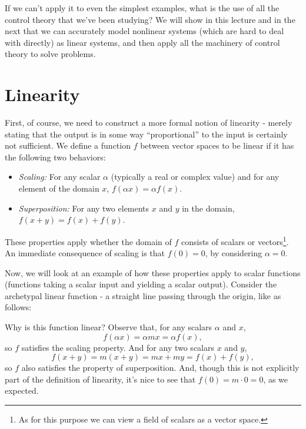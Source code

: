 \documentclass[letterpaper]{article}
\theoremstyle{remark}
\begin{document}
If we can't apply it to even the simplest examples, what is the use of all the control theory that we've been studying? We will show in this lecture and in the next that we can accurately model nonlinear systems (which are hard to deal with directly) as linear systems, and then apply all the machinery of control theory to solve problems.

\section{Linearity}
First, of course, we need to construct a more formal notion of linearity - merely stating that the output is in some way ``proportional'' to the input is certainly not sufficient. We define a function $f$ between vector spaces to be linear if it has the following two behaviors:
\begin{itemize}
    \item \emph{Scaling:} For any scalar $\alpha$ (typically a real or complex value) and for any element of the domain $x$, $f(\alpha x) = \alpha f(x)$.
    \item \emph{Superposition:} For any two elements $x$ and $y$ in the domain, $f(x + y) = f(x) + f(y)$.
\end{itemize}
These properties apply whether the domain of $f$ consists of scalars or vectors\footnote{As for this purpose we can view a field of scalars as a vector space.}. An immediate consequence of scaling is that $f(0) = 0$, by considering $\alpha = 0$.

Now, we will look at an example of how these properties apply to scalar functions (functions taking a scalar input and yielding a scalar output). Consider the archetypal linear function - a straight line passing through the origin, like as follows:
\begin{center}
\end{center}

Why is this function linear? Observe that, for any scalars $\alpha$ and $x$,
\[
    f(\alpha x) = \alpha m x = \alpha f(x),
\]
so $f$ satisfies the scaling property. And for any two scalars $x$ and $y$,
\[
    f(x + y) = m(x + y) = mx + my = f(x) + f(y),
\]
so $f$ also satisfies the property of superposition. And, though this is not explicitly part of the definition of linearity, it's nice to see that $f(0) = m\cdot 0 = 0$, as we expected.
\end{document}
